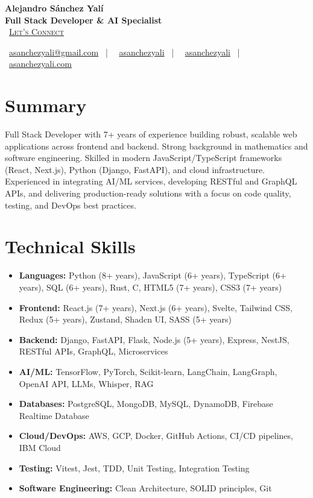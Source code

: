 \documentclass[letterpaper,11pt]{article}
\newcommand{\normalfaCalendar}{{\mdseries\faCalendar}}
\newcommand{\normalfaEnvelope}{{\mdseries\faEnvelope}}
\newcommand{\normalfaLinkedin}{{\mdseries\faLinkedin}}
\newcommand{\normalfaGithub}{{\mdseries\faGithub}}
\newcommand{\normalfaGlobe}{{\mdseries\faGlobe}}
\begin{document}
\begin{center}
\textbf{\Huge Alejandro Sánchez Yalí}\\[0.2em]
\textbf{\Large Full Stack Developer \& AI Specialist}\\[0.4em]
\small
\normalfaCalendar\ \href{https://cal.com/asanchezyali/full-time-opportunities}{\textsc{Let's Connect}}

\vspace{0.8em}
\normalfaEnvelope\ \href{mailto:asanchezyali@gmail.com}{asanchezyali@gmail.com}  ~|~
\normalfaLinkedin\ \href{https://www.linkedin.com/in/asanchezyali}{asanchezyali} ~|~
\normalfaGithub\ \href{https://github.com/asanchezyali}{asanchezyali}  ~|~
\normalfaGlobe\ \href{https://asanchezyali.com}{asanchezyali.com}
\end{center}

\section{Summary}
Full Stack Developer with 7+ years of experience building robust, scalable web applications across frontend and backend. Strong background in mathematics and software engineering. Skilled in modern JavaScript/TypeScript frameworks (React, Next.js), Python (Django, FastAPI), and cloud infrastructure. Experienced in integrating AI/ML services, developing RESTful and GraphQL APIs, and delivering production-ready solutions with a focus on code quality, testing, and DevOps best practices.

\section{Technical Skills}
\begin{itemize}[leftmargin=*, itemsep=0pt]
  \item \textbf{Languages:} Python (8+ years), JavaScript (6+ years), TypeScript (6+ years), SQL (6+ years), Rust, C, HTML5 (7+ years), CSS3 (7+ years)
  \item \textbf{Frontend:} React.js (7+ years), Next.js (6+ years), Svelte, Tailwind CSS, Redux (5+ years), Zustand, Shadcn UI, SASS (5+ years)
  \item \textbf{Backend:} Django, FastAPI, Flask, Node.js (5+ years), Express, NestJS, RESTful APIs, GraphQL, Microservices
  \item \textbf{AI/ML:} TensorFlow, PyTorch, Scikit-learn, LangChain, LangGraph, OpenAI API, LLMs, Whisper, RAG
  \item \textbf{Databases:} PostgreSQL, MongoDB, MySQL, DynamoDB, Firebase Realtime Database
  \item \textbf{Cloud/DevOps:} AWS, GCP, Docker, GitHub Actions, CI/CD pipelines, IBM Cloud
  \item \textbf{Testing:} Vitest, Jest, TDD, Unit Testing, Integration Testing
  \item \textbf{Software Engineering:} Clean Architecture, SOLID principles, Git
\end{itemize}
\end{document}
